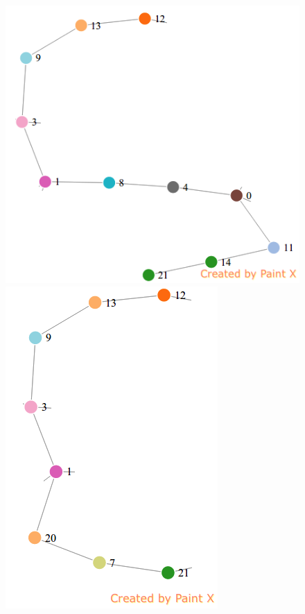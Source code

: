 \documentclass[11pt]{article}
\begin{document}
\begin{figure}
	{\includegraphics[scale=0.28]{./pics/paths/5.png}}
	{\includegraphics[scale=0.28]{./pics/paths/6.png}}

\end{figure}
\end{document}
